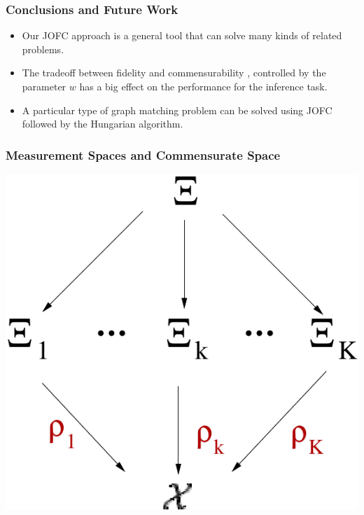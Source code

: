 \documentclass{beamer}
\begin{document}
\begin{frame}
  \frametitle{Conclusions and Future Work}
	\begin{itemize}  
      \item Our JOFC approach is a general tool that can solve many kinds of related problems.
	   \item The tradeoff between fidelity and commensurability , controlled by the parameter $w$ has a big effect on the performance for the inference task.
       \item A particular type of graph matching problem can be solved using JOFC followed by the Hungarian algorithm.
	\end{itemize}



\end{frame}


\begin{frame}
\frametitle{Measurement Spaces and Commensurate Space}
\begin{center}
    \includegraphics[scale=0.7]{gen-model-orig-proj.pdf}
  \end{center}

\end{frame}
\end{document}
